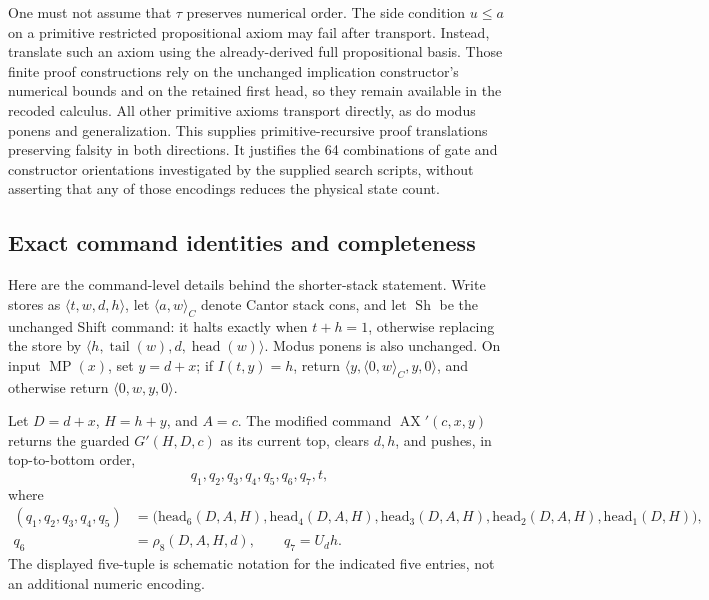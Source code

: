 One must not assume that $\tau$ preserves numerical order.  The side
condition $u\le a$ on a primitive restricted propositional axiom may fail
after transport.  Instead, translate such an axiom using the already-derived
full propositional basis.  Those finite proof constructions rely on the
unchanged implication constructor's numerical bounds and on the retained
first head, so they remain available in the recoded calculus.  All other
primitive axioms transport directly, as do modus ponens and generalization.
This supplies primitive-recursive proof translations preserving falsity in
both directions.  It justifies the 64 combinations of gate and constructor
orientations investigated by the supplied search scripts, without asserting
that any of those encodings reduces the physical state count.

\subsection{Exact command identities and completeness}
\label{sec:integrated-command-completeness}

Here are the command-level details behind the shorter-stack statement.  Write
stores as $\langle t,w,d,h\rangle$, let $\langle a,w\rangle_C$ denote Cantor
stack cons, and let $\operatorname{Sh}$ be the unchanged Shift command: it
halts exactly when $t+h=1$, otherwise replacing the store by
$\langle h,\operatorname{tail}(w),d,\operatorname{head}(w)\rangle$.
Modus ponens is also unchanged.  On input $\operatorname{MP}(x)$, set
$y=d+x$; if $I(t,y)=h$, return
$\langle y,\langle0,w\rangle_C,y,0\rangle$, and otherwise return
$\langle0,w,y,0\rangle$.

Let $D=d+x$, $H=h+y$, and $A=c$.  The modified command
$\operatorname{AX}'(c,x,y)$ returns the guarded $G'(H,D,c)$ as its current
top, clears $d,h$, and pushes, in top-to-bottom order,
\[
 q_1,q_2,q_3,q_4,q_5,q_6,q_7,t,
\]
where
\begin{align*}
 (q_1,q_2,q_3,q_4,q_5)
   &=\bigl(\mathrm{head}_6(D,A,H),\mathrm{head}_4(D,A,H),
       \mathrm{head}_3(D,A,H),\mathrm{head}_2(D,A,H),
       \mathrm{head}_1(D,H)\bigr),\\
 q_6&=\rho_8(D,A,H,d),\qquad q_7=U_dh.
\end{align*}
The displayed five-tuple is schematic notation for the indicated five entries,
not an additional numeric encoding.


